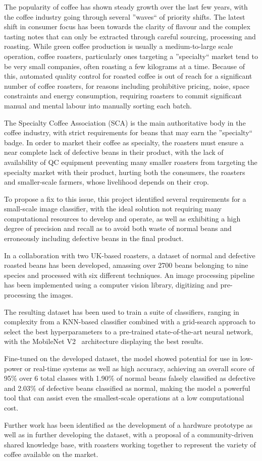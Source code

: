 The popularity of coffee has shown steady growth over the last few years,
with the coffee industry going through several ''waves`` of priority shifts.
The latest shift in consumer focus has been towards the clarity of flavour and the complex tasting notes that
can only be extracted through careful sourcing, processing and roasting.
While green coffee production is usually a medium-to-large scale operation, coffee roasters, particularly ones targeting a
''specialty`` market tend to be very small companies, often roasting a few kilograms at a time.
Because of this, automated quality control for roasted coffee is out of reach for a significant number of coffee roasters,
for reasons including prohibitive pricing, noise, space constraints and energy consumption, requiring roasters to commit
significant manual and mental labour into manually sorting each batch.

The Specialty Coffee Association (SCA) is the main authoritative body in the coffee industry, with strict requirements
for beans that may earn the ''specialty`` badge.
In order to market their coffee as specialty, the roasters must ensure a near complete lack of defective beans in their
product, with the lack of availability of QC equipment preventing many smaller roasters from targeting the specialty market with
their product, hurting both the consumers, the roasters and smaller-scale farmers, whose livelihood depends on their crop.

To propose a fix to this issue, this project identified several requirements for a small-scale image classifier,
with the ideal solution not requiring many computational resources to develop and operate, as well as exhibiting a high degree
of precision and recall as to avoid both waste of normal beans and erroneously including defective beans in the final product.

In a collaboration with two UK-based roasters, a dataset of normal and defective roasted beans has been developed, amassing
over 2700 beans belonging to nine species and processed with six different techniques.
An image processing pipeline has been implemented using a computer vision library, digitizing and pre-processing the images.

The resulting dataset has been used to train a suite of classifiers, ranging in complexity from a KNN-based classifier combined with a grid-search
approach to select the best hyperparameters to a pre-trained state-of-the-art neural network,
with the MobileNet V2~\cite{mobileNet} architecture displaying the best results.

Fine-tuned on the developed dataset, the model showed potential for use in low-power or real-time systems as well as high accuracy,
achieving an overall score of 95\% over 6 total classes with
1.90\% of normal beans falsely classified as defective and 2.03\% of defective beans classified as normal, making the model
a powerful tool that can assist even the smallest-scale operations at a low computational cost.

Further work has been identified as the development of a hardware prototype as well as in further developing the dataset,
with a proposal of a community-driven shared knowledge base, with roasters working together to represent the variety of coffee
available on the market.
